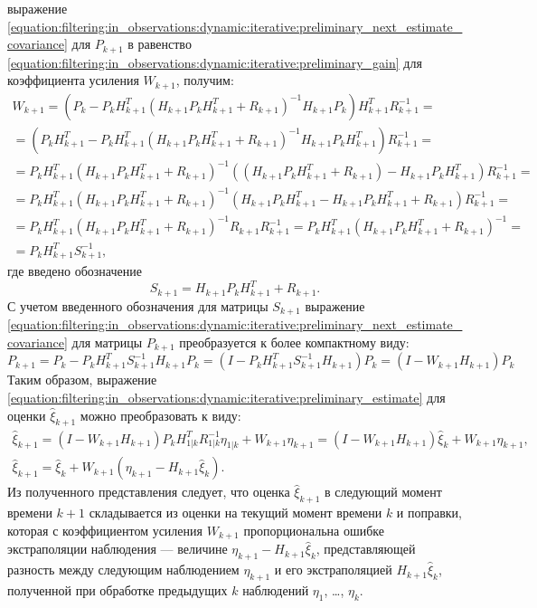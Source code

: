 выражение \eqref{equation:filtering:in_observations:dynamic:iterative:preliminary_next_estimate_covariance} для $P_{k+1}$ в равенство
\eqref{equation:filtering:in_observations:dynamic:iterative:preliminary_gain} для коэффициента усиления $W_{k+1}$, получим:
\begin{multline*}
	W_{k+1}
		= \left ( P_k - P_k H_{k+1}^T \left ( H_{k+1} P_k H_{k+1}^T + R_{k+1} \right )^{-1} H_{k+1} P_k \right ) H_{k+1}^T R_{k+1}^{-1} = \\
	= \left ( P_k H_{k+1}^T - P_k H_{k+1}^T \left ( H_{k+1} P_k H_{k+1}^T + R_{k+1} \right )^{-1} H_{k+1} P_k H_{k+1}^T \right ) R_{k+1}^{-1} = \\
	= P_k H_{k+1}^T \left ( H_{k+1} P_k H_{k+1}^T + R_{k+1} \right )^{-1} \left ( \left ( H_{k+1} P_k H_{k+1}^T + R_{k+1} \right ) -  H_{k+1} P_k H_{k+1}^T \right ) R_{k+1}^{-1} = \\
	= P_k H_{k+1}^T \left ( H_{k+1} P_k H_{k+1}^T + R_{k+1} \right )^{-1} \left ( H_{k+1} P_k H_{k+1}^T -  H_{k+1} P_k H_{k+1}^T + R_{k+1} \right ) R_{k+1}^{-1} = \\
	= P_k H_{k+1}^T \left ( H_{k+1} P_k H_{k+1}^T + R_{k+1} \right )^{-1} R_{k+1} R_{k+1}^{-1}
	= P_k H_{k+1}^T \left ( H_{k+1} P_k H_{k+1}^T + R_{k+1} \right )^{-1} = \\
	= P_k H_{k+1}^T S_{k+1}^{-1}
	,
\end{multline*}
где введено обозначение
\begin{equation} \label{equation:filtering:in_observations:dynamic:iterative:residual_covariance}
	S_{k+1} = H_{k+1} P_k H_{k+1}^T + R_{k+1} .
\end{equation}
С учетом введенного обозначения для матрицы $S_{k+1}$ выражение \eqref{equation:filtering:in_observations:dynamic:iterative:preliminary_next_estimate_covariance} для матрицы
$P_{k+1}$ преобразуется к более компактному виду:
$$
	P_{k+1}
	= P_k - P_k H_{k+1}^T S_{k+1}^{-1} H_{k+1} P_k
	= \left ( I - P_k H_{k+1}^T S_{k+1}^{-1} H_{k+1} \right ) P_k
	= \left ( I - W_{k+1} H_{k+1} \right ) P_k
$$
Таким образом, выражение \eqref{equation:filtering:in_observations:dynamic:iterative:preliminary_estimate} для оценки $\widehat{\xi}_{k+1}$ можно преобразовать к виду:
\begin{gather*}
	\widehat{\xi}_{k+1}
	= \left ( I - W_{k+1} H_{k+1} \right ) P_k H_{1|k}^T R_{1|k}^{-1} \eta_{1|k} + W_{k+1} \eta_{k+1}
	= \left ( I - W_{k+1} H_{k+1} \right ) \widehat{\xi}_k + W_{k+1} \eta_{k+1} , \\
	\widehat{\xi}_{k+1} = \widehat{\xi}_k + W_{k+1} \left ( \eta_{k+1} - H_{k+1} \widehat{\xi}_k \right ) 
	.
\end{gather*}
Из полученного представления следует, что оценка $\widehat{\xi}_{k+1}$ в следующий момент времени $k+1$ складывается из оценки на текущий момент времени
$k$ и поправки, которая с коэффициентом усиления $W_{k+1}$ пропорциональна ошибке экстраполяции наблюдения --- величине $\eta_{k+1} - H_{k+1} \widehat{\xi}_k$,
представляющей разность между следующим наблюдением $\eta_{k+1}$ и его экстраполяцией $H_{k+1} \widehat{\xi}_k$, полученной при обработке предыдущих $k$
наблюдений $\eta_1$, \dots, $\eta_k$.

